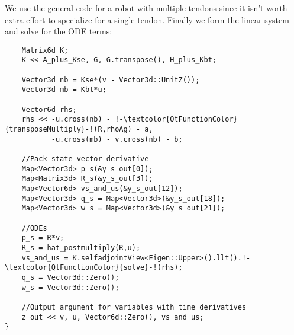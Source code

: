 \documentclass[12pt]{article}
\begin{document}
We use the general code for a robot with multiple tendons since it isn't worth extra effort to specialize for a single tendon. Finally we form the linear system and solve for the ODE terms:
\begin{lstlisting}
    Matrix6d K;
    K << A_plus_Kse, G, G.transpose(), H_plus_Kbt;

    Vector3d nb = Kse*(v - Vector3d::UnitZ());
    Vector3d mb = Kbt*u;

    Vector6d rhs;
    rhs << -u.cross(nb) - !-\textcolor{QtFunctionColor}{transposeMultiply}-!(R,rhoAg) - a,
           -u.cross(mb) - v.cross(nb) - b;

    //Pack state vector derivative
    Map<Vector3d> p_s(&y_s_out[0]);
    Map<Matrix3d> R_s(&y_s_out[3]);
    Map<Vector6d> vs_and_us(&y_s_out[12]);
    Map<Vector3d> q_s = Map<Vector3d>(&y_s_out[18]);
    Map<Vector3d> w_s = Map<Vector3d>(&y_s_out[21]);

    //ODEs
    p_s = R*v;
    R_s = hat_postmultiply(R,u);
    vs_and_us = K.selfadjointView<Eigen::Upper>().llt().!-\textcolor{QtFunctionColor}{solve}-!(rhs);
    q_s = Vector3d::Zero();
    w_s = Vector3d::Zero();

    //Output argument for variables with time derivatives
    z_out << v, u, Vector6d::Zero(), vs_and_us;
}
\end{lstlisting}
\end{document}
